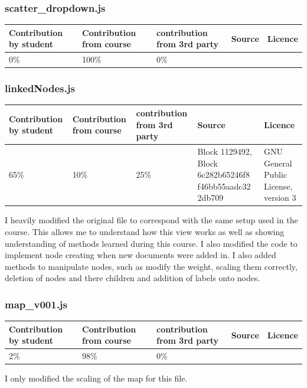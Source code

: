 \documentclass[a4paper, 11pt]{article}
\begin{document}
\subsubsection{scatter\_dropdown.js}
\begin{center}
 \begin{tabular}{||p{}|p{}|p{}|p{}|p{}||} 
 \hline
 Contribution by student & Contribution from course & contribution from 3rd party & Source & Licence 
 \\
 \hline
 0\% & 100\% & 0\% & & 
 \\
 \hline
\end{tabular}
\end{center}


\subsubsection{linkedNodes.js}
\begin{center}
 \begin{tabular}{||p{}|p{}|p{}|p{}|p{}||} 
 \hline
 Contribution by student & Contribution from course & contribution from 3rd party & Source & Licence 
 \\
 \hline
 65\% & 10\% & 25\% & Block 1129492, Block 6c282b65246f8 f46bb55aadc32 2db709 &  GNU General Public License, version 3
 \\
 \hline
\end{tabular}
\end{center}
I heavily modified the original file to correspond with the same setup used in the course. This allows me to understand how this view works as well as showing understanding of methods learned during this course. I also modified the code to implement node creating when new documents were added in. I also added methods to manipulate nodes, such as modify the weight, scaling them correctly, deletion of nodes and there children and addition of labels onto nodes.


\subsubsection{map\_v001.js}
\begin{center}
 \begin{tabular}{||p{}|p{}|p{}|p{}|p{}||} 
 \hline
 Contribution by student & Contribution from course & contribution from 3rd party & Source & Licence 
 \\
 \hline
 2\% & 98\% & 0\% &  & 
 \\
 \hline
\end{tabular}
\end{center}
I only modified the scaling of the map for this file.
\end{document}
